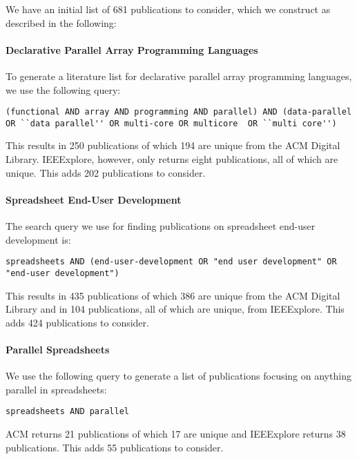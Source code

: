 \documentclass[a4paper]{article}
\begin{document}
We have an initial list of 681 publications to consider, which we
construct as described in the following:

\paragraph{Declarative Parallel Array Programming Languages}

To generate a literature list for declarative parallel array
programming languages, we use the following query:

\begin{lstlisting}
(functional AND array AND programming AND parallel) AND (data-parallel OR ``data parallel'' OR multi-core OR multicore  OR ``multi core'')
\end{lstlisting}

\noindent This results in 250 publications of which 194 are unique from the ACM
Digital Library. IEEExplore, however, only returns eight publications,
all of which are unique. This adds 202 publications to consider.

\paragraph{Spreadsheet End-User Development}

The search query we use for finding publications on spreadsheet
end-user development is:

\begin{lstlisting}
spreadsheets AND (end-user-development OR "end user development" OR "end-user development")
\end{lstlisting}

\noindent This results in 435 publications of which 386 are unique from the ACM
Digital Library and in 104 publications, all of which are unique, from
IEEExplore. This adds 424 publications to consider.

\paragraph{Parallel Spreadsheets}

We use the following query to generate a list of publications focusing
on anything parallel in spreadsheets:

\begin{lstlisting}
spreadsheets AND parallel
\end{lstlisting}

\noindent ACM returns 21 publications of which 17 are unique and
IEEExplore returns 38 publications. This adds 55 publications to
consider.
\end{document}

